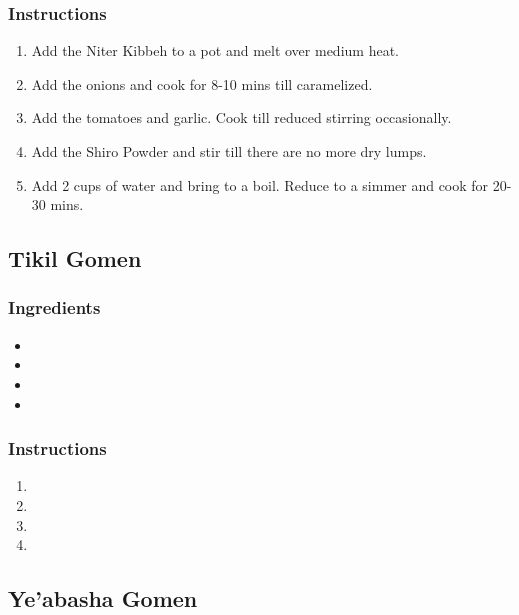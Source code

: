 \documentclass[11pt]{article}
\begin{document}
\subsubsection*{Instructions}
\label{sec:orgbf306d3}
\begin{enumerate}
\item Add the Niter Kibbeh to a pot and melt over medium heat.
\item Add the onions and cook for 8-10 mins till caramelized.
\item Add the tomatoes and garlic. Cook till reduced stirring occasionally.
\item Add the Shiro Powder and stir till there are no more dry lumps.
\item Add 2 cups of water and bring to a boil. Reduce to a simmer and cook for 20-30 mins.
\end{enumerate}

\subsection{Tikil Gomen}
\label{sec:org2d13869}
\subsubsection*{Ingredients}
\label{sec:orgbdb9733}
\begin{itemize}
\item 

\item 

\item 

\item 
\end{itemize}
\subsubsection*{Instructions}
\label{sec:orgdf9d3db}
\begin{enumerate}
\item 

\item 

\item 

\item 
\end{enumerate}
\subsection{Ye'abasha Gomen}
\label{sec:org0d243f0}
\end{document}
